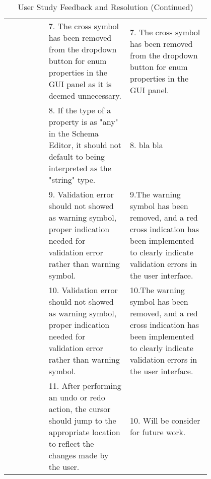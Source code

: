 \begin{table*}
\begin{tabular}{|c|p{0.4\linewidth}|p{0.4\linewidth}|}
        \cline{2-3}
        & 7. The cross symbol has been removed from the dropdown button for enum properties in the GUI panel as it is deemed unnecessary. & 7. The cross symbol has been removed from the dropdown button for enum properties in the GUI panel. \\
        \cline{2-3}
        & 8. If the type of a property is as "any" in the Schema Editor, it should not default to being interpreted as the "string" type. & 8. bla bla \\
        \cline{2-3}
        & 9. Validation error should not showed as warning symbol, proper indication needed for validation error rather than warning symbol. & 9.The warning symbol has been removed, and a red cross indication has been implemented to clearly indicate validation errors in the user interface. \\
        \cline{2-3}
        & 10. Validation error should not showed as warning symbol, proper indication needed for validation error rather than warning symbol. & 10.The warning symbol has been removed, and a red cross indication has been implemented to clearly indicate validation errors in the user interface. \\
        \cline{2-3}
        & 11. After performing an undo or redo action, the cursor should jump to the appropriate location to reflect the changes made by the user.& 10. Will be consider for future work. \\
        \hline
    \end{tabular}
    \caption* {User Study Feedback and Resolution (Continued)}
\end{table*}


\clearpage %

